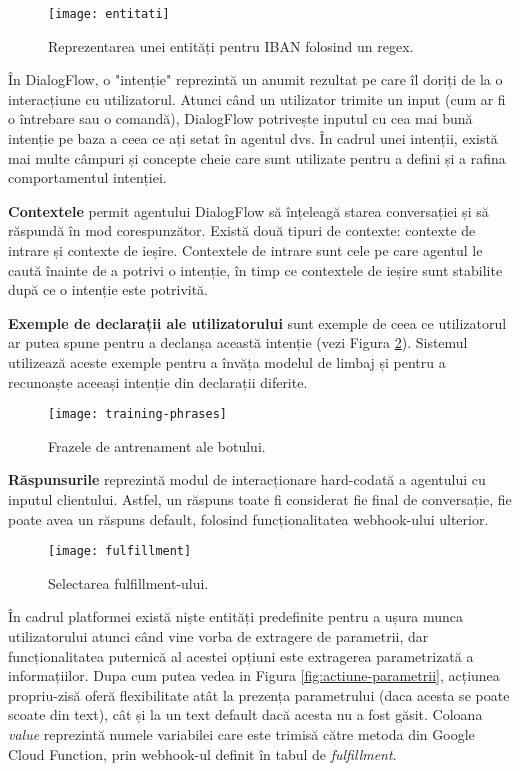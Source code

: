 \begin{figure}[h]
    \centering
    \texttt{[image: entitati]}
    \caption{Reprezentarea unei entități pentru IBAN folosind un regex.}
    \label{fig:entitati}
\end{figure}

În DialogFlow, o "intenție" reprezintă un anumit rezultat pe care îl doriți de la o interacțiune cu utilizatorul. Atunci când un utilizator trimite un input (cum ar fi o întrebare sau o comandă), DialogFlow potrivește inputul cu cea mai bună intenție pe baza a ceea ce ați setat în agentul dvs. În cadrul unei intenții, există mai multe câmpuri și concepte cheie care sunt utilizate pentru a defini și a rafina comportamentul intenției.

\textbf{Contextele} permit agentului DialogFlow să înțeleagă starea conversației și să răspundă în mod corespunzător. Există două tipuri de contexte: contexte de intrare și contexte de ieșire. Contextele de intrare sunt cele pe care agentul le caută înainte de a potrivi o intenție, în timp ce contextele de ieșire sunt stabilite după ce o intenție este potrivită.

\textbf{Exemple de declarații ale utilizatorului} sunt exemple de ceea ce utilizatorul ar putea spune pentru a declanșa această intenție (vezi Figura \ref{fig:training-phrases}). Sistemul utilizează aceste exemple pentru a învăța modelul de limbaj și pentru a recunoaște aceeași intenție din declarații diferite.

\begin{figure}[H]
    \centering
    \texttt{[image: training-phrases]}
    \caption{Frazele de antrenament ale botului.}
    \label{fig:training-phrases}
\end{figure}

\textbf{Răspunsurile} reprezintă modul de interacționare hard-codată a agentului cu inputul clientului. Astfel, un răspuns toate fi considerat fie final de conversație, fie poate avea un răspuns default, folosind funcționalitatea webhook-ului ulterior.

\begin{figure}[H]
    \centering
    \texttt{[image: fulfillment]}
    \caption{Selectarea fulfillment-ului.}
    \label{fig:fulfillment}
\end{figure}

În cadrul platformei există niște entități predefinite \cite{system-entities} pentru a ușura munca utilizatorului atunci când vine vorba de extragere de parametrii, dar funcționalitatea puternică al acestei opțiuni este extragerea parametrizată a informațiilor. Dupa cum putea vedea in Figura \ref{fig:actiune-parametrii}, acțiunea propriu-zisă oferă flexibilitate atât la prezența parametrului (daca acesta se poate scoate din text), cât și la un text default dacă acesta nu a fost găsit. Coloana \emph{value} reprezintă numele variabilei care este trimisă către metoda din Google Cloud Function, prin webhook-ul definit în tabul de \emph{fulfillment}.

